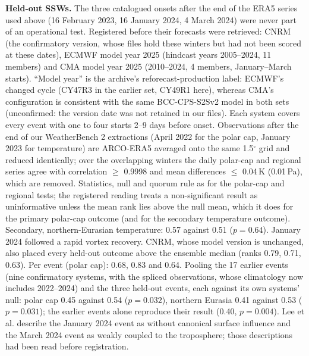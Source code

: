 \documentclass[11pt]{article}
\begin{document}
\textbf{Held-out SSWs.} The three catalogued onsets after the end of the ERA5 series used above (16 February 2023, 16 January 2024, 4 March 2024) were never part of an operational test. Registered before their forecasts were retrieved: CNRM (the confirmatory version, whose files hold these winters but had not been scored at these dates), ECMWF model year 2025 (hindcast years 2005–2024, 11 members) and CMA model year 2025 (2010–2024, 4 members, January–March starts). “Model year” is the archive's reforecast-production label: ECMWF's changed cycle (CY47R3 in the earlier set, CY49R1 here), whereas CMA's configuration is consistent with the same BCC-CPS-S2Sv2 model in both sets (unconfirmed: the version date was not retained in our files). Each system covers every event with one to four starts 2–9 days before onset. Observations after the end of our WeatherBench 2 extractions (April 2022 for the polar cap, January 2023 for temperature) are ARCO-ERA5 averaged onto the same 1.5$^\circ$ grid and reduced identically; over the overlapping winters the daily polar-cap and regional series agree with correlation $\ge$ 0.9998 and mean differences $\le$ 0.04\,K (0.01\,Pa), which are removed. Statistics, null and quorum rule as for the polar-cap and regional tests; the registered reading treats a non-significant result as uninformative unless the mean rank lies above the null mean, which it does for the primary polar-cap outcome (and for the secondary temperature outcome). Secondary, northern-Eurasian temperature: 0.57 against 0.51 ($p = 0.64$). January 2024 followed a rapid vortex recovery\cite{leeSH25}. CNRM, whose model version is unchanged, also placed every held-out outcome above the ensemble median (ranks 0.79, 0.71, 0.63). Per event (polar cap): 0.68, 0.83 and 0.64. Pooling the 17 earlier events (nine confirmatory systems, with the spliced observations, whose climatology now includes 2022–2024) and the three held-out events, each against its own systems' null: polar cap 0.45 against 0.54 ($p = 0.032$), northern Eurasia 0.41 against 0.53 ($p = 0.031$); the earlier events alone reproduce their result (0.40, $p = 0.004$). Lee et al.\cite{leeSH25} describe the January 2024 event as without canonical surface influence and the March 2024 event as weakly coupled to the troposphere; those descriptions had been read before registration.
\end{document}
